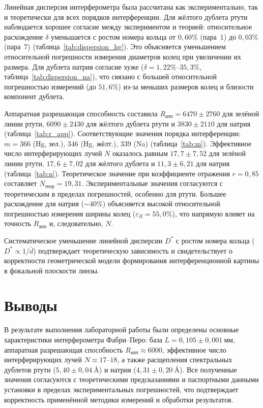\documentclass[a4paper]{article}
\begin{document}
Линейная дисперсия интерферометра была рассчитана как экспериментально, так и теоретически для всех порядков интерференции. Для жёлтого дублета ртути наблюдается хорошее согласие между экспериментом и теорией: относительное расхождение $\delta$ уменьшается с ростом номера кольца от $0{,}60\%$ (пара~1) до $0{,}03\%$ (пара~7) (таблица~\ref{tab:dispersion_hg}). Это объясняется уменьшением относительной погрешности измерения диаметров колец при увеличении их размера. Для дублета натрия согласие хуже ($\delta = 1{,}22\%\text{--}35{,}3\%$, таблица~\ref{tab:dispersion_na}), что связано с большей относительной погрешностью измерений (до $51{,}6\%$) из-за меньших размеров колец и близости компонент дублета.

Аппаратная разрешающая способность составила $R_{\text{апп}} = 6470 \pm 2760$ для зелёной линии ртути, $6090 \pm 2430$ для жёлтого дублета ртути и $3830 \pm 2110$ для натрия (таблица~\ref{tab:r_app}). Соответствующие значения порядка интерференции: $m = 366$ (Hg, зел.), $346$ (Hg, жёлт.), $339$ (Na) (таблица~\ref{tab:m}). Эффективное число интерферирующих лучей $N$ оказалось равным $17{,}7 \pm 7{,}52$ для зелёной линии ртути, $17{,}6 \pm 7{,}02$ для жёлтого дублета и $11{,}3 \pm 6{,}21$ для натрия (таблица~\ref{tab:n}). Теоретическое значение при коэффициенте отражения $r = 0{,}85$ составляет $N_{\text{теор}} = 19{,}31$. Экспериментальные значения согласуются с теоретическим в пределах погрешностей, особенно для ртути. Большее расхождение для натрия ($\sim 40\%$) объясняется высокой относительной погрешностью измерения ширины колец ($\varepsilon_R = 55{,}0\%$), что напрямую влияет на точность $R_{\text{апп}}$ и, следовательно, $N$.

Систематическое уменьшение линейной дисперсии $D^*$ с ростом номера кольца ($D^* \propto 1/\bar{d}$) подтверждает теоретическую зависимость и свидетельствует о корректности геометрической модели формирования интерференционной картины в фокальной плоскости линзы.

\section{Выводы}

В результате выполнения лабораторной работы были определены основные характеристики интерферометра Фабри–Перо: база $L = 0{,}105 \pm 0{,}001~\text{мм}$, аппаратная разрешающая способность $R_{\text{апп}} \approx 6000$, эффективное число интерферирующих лучей $N \approx 17\text{--}18$, а также расщепления спектральных дублетов ртути ($5{,}40 \pm 0{,}04~\text{\AA}$) и натрия ($4{,}31 \pm 0{,}20~\text{\AA}$). Все полученные значения согласуются с теоретическими предсказаниями и паспортными данными установки в пределах экспериментальных погрешностей, что подтверждает корректность применённой методики измерений и обработки результатов.
\end{document}
